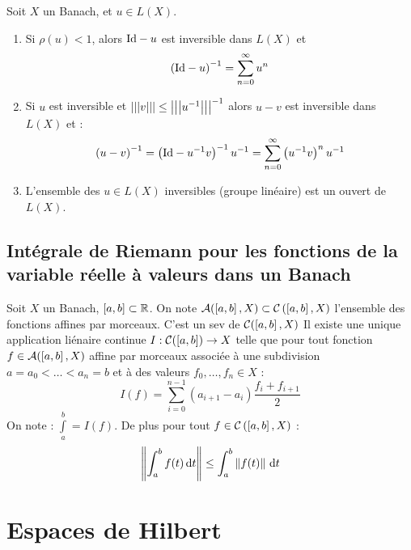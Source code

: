 \documentclass{cours}
\begin{document}
\begin{theorem}
    Soit $X$ un Banach, et $u \in L(X)$.
    \begin{enumerate}
        \item Si $\rho(u) < 1$, alors $\mathrm{Id} - u$ est inversible dans $L(X)$ et \[\left(\mathrm{Id} - u\right)^{-1} = \sum_{n = 0}^{\infty} u^{n}\]
        \item Si $u$ est inversible et $\left| \left| \left| v \right| \right| \right| \leq \left| \left| \left| u^{-1} \right| \right| \right|^{-1}$ alors $u - v$ est inversible dans $L(X)$ et : \[\left(u - v\right)^{-1} = \left(\mathrm{Id} - u^{-1}v\right)^{-1}u^{-1} = \sum_{n = 0}^{\infty}\left(u^{-1}v\right)^{n}u^{-1}\]
        \item L'ensemble des $u \in L(X)$ inversibles (groupe linéaire) est un ouvert de $L(X)$.
    \end{enumerate}
\end{theorem}

\subsection{Intégrale de Riemann pour les fonctions de la variable réelle à valeurs dans un Banach}
\begin{theorem}
    Soit $X$ un Banach, $\left[a, b\right] \subset \mathbb{R}$. On note $\mathcal{A}(\left[a, b\right], X) \subset \mathcal{C}\left(\left[a, b\right], X\right)$ l'ensemble des fonctions affines par morceaux. C'est un sev de $\mathcal{C}(\left[a, b\right], X)$
    Il existe une unique application liénaire continue $I : \mathcal{C}(\left[a, b\right]) \rightarrow X$ telle que pour tout fonction $f \in \mathcal{A}(\left[a, b\right], X)$ affine par morceaux associée à une subdivision $a = a_{0} < \ldots < a_{n} = b$ et à des valeurs $f_{0}, \ldots, f_{n} \in X$ :
    \[
        I(f) = \sum_{i = 0}^{n - 1}(a_{i + 1} - a_{i})\frac{f_{i} + f_{i + 1}}{2}
    \]
    On note : $\int\limits_{a}^{b} = I(f)$. De plus pour tout $f \in \mathcal{C}\left(\left[a, b\right], X\right)$ :
    \[
        \left\lVert \int_{a}^{b} f(t) {\rm \, d} t \right\rVert \leq \int_{a}^{b}\left\lVert f(t) \right\rVert{\rm \, d} t
    \]
\end{theorem}

\section{Espaces de Hilbert}
\end{document}
